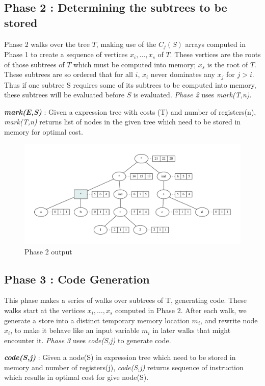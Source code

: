 \documentclass{article}
\begin{document}
\subsection{Phase 2 : Determining the subtrees to be stored}
Phase 2 walks over the tree $T$, making use of the $C_j(S)$ arrays computed in Phase 1 to create a sequence of vertices $x_i, \dots, x_s$ of $T$. These vertices are the roots of those subtrees of $T$ which must be computed into memory; $x_s$ is the root of $T$.
These subtrees are so ordered that for all $i$, $x_i$ never dominates any $x_j$ for $j > i$. Thus if one subtree S requires some of its subtrees to be computed into memory, these subtrees will be evaluated before $S$ is evaluated. \emph{Phase 2} uses \emph{mark(T,n)}.

\textbf{\emph{mark(E,S)}} : Given a expression tree with costs (T) and number of registers(n), \emph{mark(T,n)} returns list of nodes in the given tree which need to be stored in memory for optimal cost.

\begin{figure}[!htb]
\centering
\hspace*{-1.5cm}
\includegraphics[scale=0.5]{phase2.pdf}
\caption{Phase 2 output}
\label{fig:expression}
\end{figure}


\subsection{Phase 3 : Code Generation}
This phase makes a series of walks over subtrees of T, generating code. These walks start at the vertices $x_i, \dots, x_s$ computed in Phase 2. After each walk, we generate a store into a distinct temporary memory location $m_i$, and rewrite node $x_i$, to make it behave like an input variable $m_i$ in later walks that might
encounter it. \emph{Phase 3} uses \emph{code(S,j)} to generate code.

\textbf{\emph{code(S,j)}} : Given a node(S) in expression tree which need to be stored in memory and number of registers(j), \emph{code(S,j)} returns sequence of instruction which results in optimal cost for give node(S).\\\\
\end{document}
